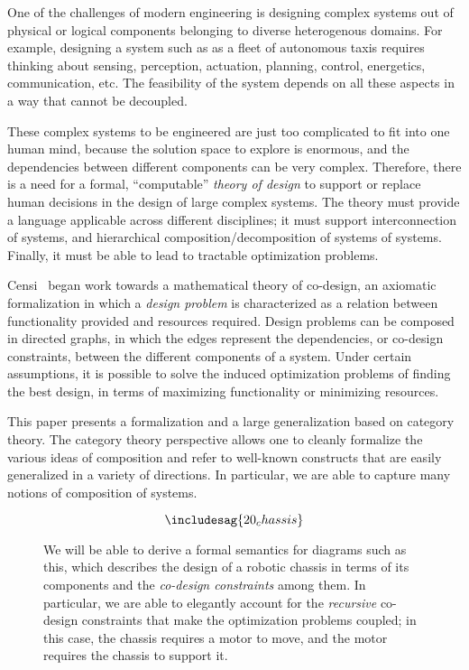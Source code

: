 One of the challenges of modern engineering is designing complex systems out
of physical or logical components belonging to diverse heterogenous domains.
For example, designing a system such as as a fleet of autonomous taxis
requires thinking about sensing, perception, actuation, planning, control,
energetics, communication, etc. The feasibility of the system depends on all
these aspects in a way that cannot be decoupled.

These complex systems to be engineered are just too complicated to
fit into one human mind, because the solution space to explore is enormous,
and the dependencies between different components can be very complex.
Therefore, there is a need for a formal, ``computable'' \emph{theory of design} to
support or replace human decisions in the design of large complex systems.
The theory must provide a language applicable across different disciplines;
it  must support interconnection of systems, and hierarchical composition/decomposition of systems of systems. Finally,
it must be able to lead to tractable optimization problems.

Censi~\cite{Censi2017} began work towards a mathematical theory of co-design,
an axiomatic formalization in which a \emph{design problem} is characterized
as a relation between functionality provided and resources required. Design
problems can be composed in directed graphs, in which the edges represent
the dependencies, or co-design constraints, between the different components
of a system. Under certain assumptions, it is possible to solve the induced
optimization problems of finding the best design, in terms of maximizing
functionality or minimizing resources.

This paper presents a formalization and a large generalization based on
category theory. The category theory perspective allows one to cleanly
formalize the various ideas of composition and refer to well-known
constructs that are easily generalized in a variety of directions. In particular, we are able to capture many notions of composition
of systems.


\begin{figure}[h!]
    \begin{equation}\label{eqn:chassis}
    \includesag{20_chassis}
    \end{equation}
    \caption{
    We will be able to derive a formal semantics for
    diagrams such as this, which describes the design of a robotic
    chassis in terms of its components and the \emph{co-design constraints} among
    them. In particular, we are able to elegantly account for the
    \emph{recursive} co-design constraints that make the optimization problems
    coupled; in this case, the chassis requires a motor to move, and the motor
    requires the chassis to support it.
    }
\end{figure}


